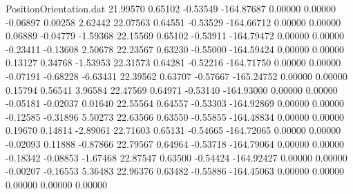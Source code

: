 \begin{filecontents}{PositionOrientation.dat}
  21.99570    0.65102   -0.53549  -164.87687    0.00000    0.00000   -0.06897    0.00258    2.62442
  22.07563    0.64551   -0.53529  -164.66712    0.00000    0.00000    0.06889   -0.04779   -1.59368
  22.15569    0.65102   -0.53911  -164.79472    0.00000    0.00000   -0.23411   -0.13608    2.50678
  22.23567    0.63230   -0.55000  -164.59424    0.00000    0.00000    0.13127    0.34768   -1.53953
  22.31573    0.64281   -0.52216  -164.71750    0.00000    0.00000   -0.07191   -0.68228   -6.63431
  22.39562    0.63707   -0.57667  -165.24752    0.00000    0.00000    0.15794    0.56541    3.96584
  22.47569    0.64971   -0.53140  -164.93000    0.00000    0.00000   -0.05181   -0.02037    0.01640
  22.55564    0.64557   -0.53303  -164.92869    0.00000    0.00000   -0.12585   -0.31896    5.50273
  22.63566    0.63550   -0.55855  -164.48834    0.00000    0.00000    0.19670    0.14814   -2.89061
  22.71603    0.65131   -0.54665  -164.72065    0.00000    0.00000   -0.02093    0.11888   -0.87866
  22.79567    0.64964   -0.53718  -164.79064    0.00000    0.00000   -0.18342   -0.08853   -1.67468
  22.87547    0.63500   -0.54424  -164.92427    0.00000    0.00000   -0.00207   -0.16553    5.36483
  22.96376    0.63482   -0.55886  -164.45063    0.00000    0.00000    0.00000    0.00000    0.00000
\end{filecontents}
